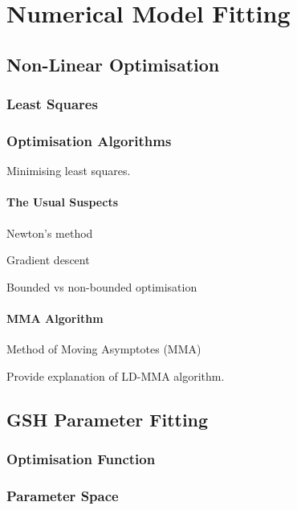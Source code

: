 
\chapter{Numerical Model Fitting}
\label{chapter4}

\section{Non-Linear Optimisation}

\subsection{Least Squares}

\subsection{Optimisation Algorithms}

Minimising least squares.

\subsubsection{The Usual Suspects}

Newton's method

Gradient descent

Bounded vs non-bounded optimisation

\subsubsection{MMA Algorithm}

Method of Moving Asymptotes (MMA)

Provide explanation of LD-MMA algorithm. 

\section{GSH Parameter Fitting}

\subsection{Optimisation Function}

\subsection{Parameter Space}

